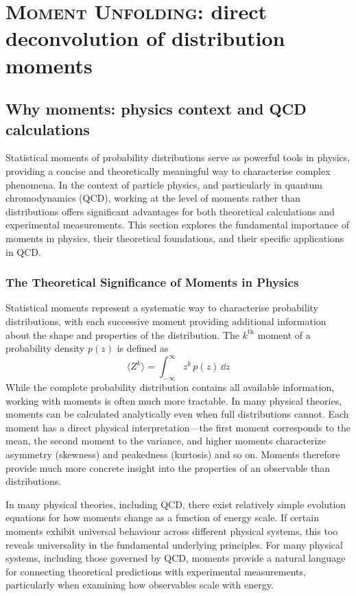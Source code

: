 \chapter{\textsc{Moment Unfolding}: direct deconvolution of distribution moments}
\label{chap:moment-unfolding}
\section{Why moments: physics context and QCD calculations}
    Statistical moments of probability distributions serve as powerful tools in physics, providing a concise and theoretically meaningful way to characterise complex phenomena.
    In the context of particle physics, and particularly in quantum chromodynamics (QCD), working at the level of moments rather than distributions offers significant advantages for both theoretical calculations and experimental measurements.
    This section explores the fundamental importance of moments in physics, their theoretical foundations, and their specific applications in QCD.
    \subsection{The Theoretical Significance of Moments in Physics}
        Statistical moments represent a systematic way to characterise probability distributions, with each successive moment providing additional information about the shape and properties of the distribution.
        The $k^{\text{th}}$ moment of a probability density $p(z)$ is defined as
        \[
            \langle Z^k \rangle = \int_{-\infty}^{\infty} z^k\, p(z)\, \dd z
        \]
        While the complete probability distribution contains all available information, working with moments is often much more tractable.
        In many physical theories, moments can be calculated analytically even when full distributions cannot.
        Each moment has a direct physical interpretation---the first moment corresponds to the mean, the second moment to the variance, and higher moments characterize asymmetry (skewness) and peakedness (kurtosis) and so on.
        Moments therefore provide much more concrete insight into the properties of an observable than distributions.
        
        In many physical theories, including QCD, there exist relatively simple evolution equations for how moments change as a function of energy scale.
        If certain moments exhibit universal behaviour across different physical systems, this too reveals universality in the fundamental underlying principles.
        For many physical systems, including those governed by QCD, moments provide a natural language for connecting theoretical predictions with experimental measurements, particularly when examining how observables scale with energy.
